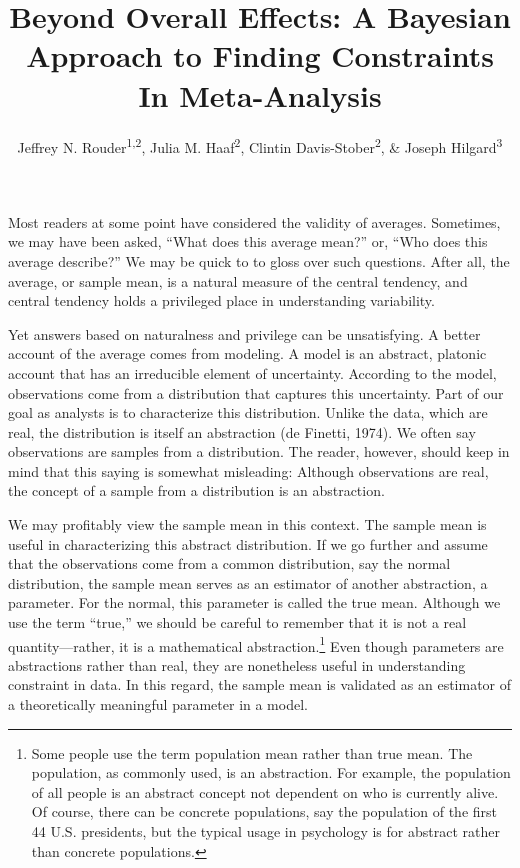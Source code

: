 \documentclass[english,man]{apa6}
\title{Beyond Overall Effects: A Bayesian Approach to Finding Constraints In
Meta-Analysis}
\author{Jeffrey N. Rouder\textsuperscript{1,2}, Julia M. Haaf\textsuperscript{2}, Clintin Davis-Stober\textsuperscript{2}, \& Joseph Hilgard\textsuperscript{3}}
\affiliation{
    \vspace{0.5cm}
          \textsuperscript{1} University of California, Irvine\\
          \textsuperscript{2} University of Missouri\\
          \textsuperscript{3} Illinois State University  }
\theoremstyle{definition}
\theoremstyle{definition}
\theoremstyle{remark}
\begin{document}
\maketitle

\setcounter{secnumdepth}{0}



Most readers at some point have considered the validity of averages.
Sometimes, we may have been asked, \enquote{What does this average
mean?} or, \enquote{Who does this average describe?} We may be quick to
to gloss over such questions. After all, the average, or sample mean, is
a natural measure of the central tendency, and central tendency holds a
privileged place in understanding variability.

Yet answers based on naturalness and privilege can be unsatisfying. A
better account of the average comes from modeling. A model is an
abstract, platonic account that has an irreducible element of
uncertainty. According to the model, observations come from a
distribution that captures this uncertainty. Part of our goal as
analysts is to characterize this distribution. Unlike the data, which
are real, the distribution is itself an abstraction (de Finetti, 1974).
We often say observations are samples from a distribution. The reader,
however, should keep in mind that this saying is somewhat misleading:
Although observations are real, the concept of a sample from a
distribution is an abstraction.

We may profitably view the sample mean in this context. The sample mean
is useful in characterizing this abstract distribution. If we go further
and assume that the observations come from a common distribution, say
the normal distribution, the sample mean serves as an estimator of
another abstraction, a parameter. For the normal, this parameter is
called the true mean. Although we use the term \enquote{true,} we should
be careful to remember that it is not a real quantity---rather, it is a
mathematical abstraction.\footnote{Some people use the term population
  mean rather than true mean. The population, as commonly used, is an
  abstraction. For example, the population of all people is an abstract
  concept not dependent on who is currently alive. Of course, there can
  be concrete populations, say the population of the first 44 U.S.
  presidents, but the typical usage in psychology is for abstract rather
  than concrete populations.} Even though parameters are abstractions
rather than real, they are nonetheless useful in understanding
constraint in data. In this regard, the sample mean is validated as an
estimator of a theoretically meaningful parameter in a model.
\end{document}
